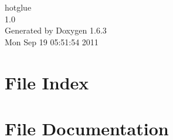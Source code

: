 \documentclass[a4paper]{book}
\begin{document}
\hypersetup{pageanchor=false}
\begin{titlepage}
\vspace*{7cm}
\begin{center}
{\Large hotglue \\[1ex]\large 1.0 }\\
\vspace*{1cm}
{\large Generated by Doxygen 1.6.3}\\
\vspace*{0.5cm}
{\small Mon Sep 19 05:51:54 2011}\\
\end{center}
\end{titlepage}
\clearemptydoublepage
{}
\tableofcontents
\clearemptydoublepage
{}
\hypersetup{pageanchor=true}
\chapter{File Index}

\chapter{File Documentation}
























\printindex
\end{document}
